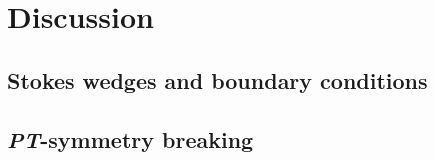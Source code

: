\documentclass[10pt, a4paper, singlespacing, headsepline]{article}
\newcommand\PT{\textit{PT}}
\begin{document}
\section{Discussion}
\blindtext

\subsection{Stokes wedges and boundary conditions}


\subsection{\PT-symmetry breaking}







\end{document}

